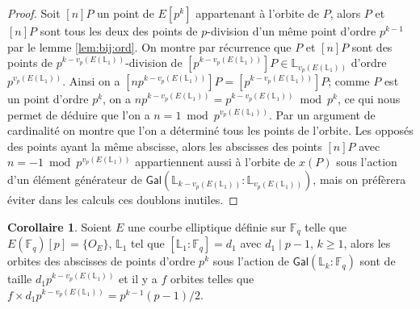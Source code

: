 \documentclass[10pt,a4paper]{book}
\theoremstyle{plain}
\theoremstyle{definition}
\theoremstyle{definition}
\newtheorem{cor}[thm]{Corollaire}
\theoremstyle{definition}
\theoremstyle{definition}
\theoremstyle{remark}
\theoremstyle{remark}
\theoremstyle{definition}
\begin{document}
\begin{proof}
Soit $[n]P$ un point de $E[p^k]$ appartenant à l'orbite de $P$, alors $P$ et 
$[n]P$ sont tous les deux des points de $p$-division d'un même point d'ordre 
$p^{k-1}$ par le lemme \ref{lem:bij:ord}. On montre par récurrence que $P$ et 
$[n]P$ sont des points de $p^{k-v_p({E(\mathbb{L}_1)})}$-division de 
$[p^{k-v_p({E(\mathbb{L}_1)})}]P \in \mathbb{L}_{v_p({E(\mathbb{L}_1)})}$ 
d'ordre $p^{v_p(E(\mathbb{L}_1))}$. Ainsi on a $[np^{k-v_p(E(\mathbb{L}_1))}]P=
[p^{k-v_p(E(\mathbb{L}_1))}]P$; comme $P$ est un point d'ordre $p^k$, on a 
$np^{k-v_p(E(\mathbb{L}_1))}=p^{k-v_p(E(\mathbb{L}_1))} \bmod p^k$, ce qui nous 
permet de déduire que l'on a $n=1 \bmod p^{v_p(E(\mathbb{L}_1))}$. Par un 
argument de cardinalité on montre que l'on a déterminé tous les points de 
l'orbite. Les opposés des points ayant la même abscisse, alors les abscisses 
des points $[n]P$ avec $n=-1 \bmod p^{v_p(E(\mathbb{L}_1))}$ appartiennent 
aussi à l'orbite de $x(P)$ sous l'action d'un élément générateur de 
$\mathsf{Gal}(\mathbb{L}_{k-v_p(E(\mathbb{L}_1))}:
\mathbb{L}_{v_p(E(\mathbb{L}_1))})$, mais on préfèrera éviter dans les calculs 
ces doublons inutiles.
\end{proof}

\begin{cor}
\label{cor:orb:fro}
Soient $E$ une courbe elliptique définie sur $\mathbb{F}_q$ telle que 
$E(\mathbb{F}_q)[p]=\{O_E\}$, $\mathbb{L}_1$ tel que $[\mathbb{L}_1:
\mathbb{F}_q]=d_1$ avec $d_1 \mid p-1$, $k \geqslant 1$, alors les orbites des 
abscisses de points d'ordre $p^k$ sous l'action de $\mathsf{Gal}
(\mathbb{L}_{k}:\mathbb{F}_q)$ sont de taille $d_1 p^{k-v_p(E(\mathbb{L}_1))}$ 
et il y a $f$ orbites telles que $f \times d_1 p^{k-v_p(E(\mathbb{L}_1))} = 
p^{k-1}(p-1)/2$.
\end{cor}

\end{document}
